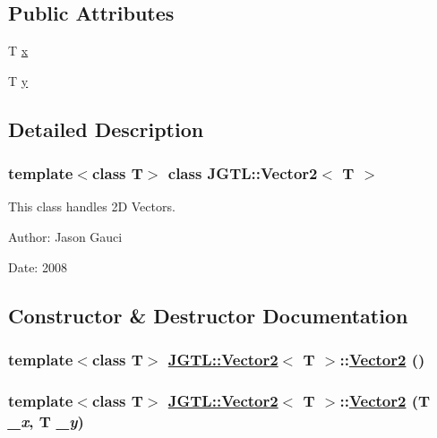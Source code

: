 \subsection*{Public Attributes}
\begin{CompactItemize}
\item 
T \hyperlink{class_j_g_t_l_1_1_vector2_74fc6db01fb0803a14a786f0a798746e}{x}
\item 
T \hyperlink{class_j_g_t_l_1_1_vector2_f01a24f7cf968ea1c9f0721b7bb00cb4}{y}
\end{CompactItemize}


\subsection{Detailed Description}
\subsubsection*{template$<$class T$>$ class JGTL::Vector2$<$ T $>$}

This class handles 2D Vectors. 

\begin{Desc}
\item[Author:]Jason Gauci \end{Desc}
\begin{Desc}
\item[Date:]2008 \end{Desc}




\subsection{Constructor \& Destructor Documentation}
\hypertarget{class_j_g_t_l_1_1_vector2_9dfa1d4fc791920450349e2c677c371a}{
\subsubsection[Vector2]{\setlength{\rightskip}{0pt plus 5cm}template$<$class T$>$ \hyperlink{class_j_g_t_l_1_1_vector2}{JGTL::Vector2}$<$ T $>$::\hyperlink{class_j_g_t_l_1_1_vector2}{Vector2} ()}}
\label{class_j_g_t_l_1_1_vector2_9dfa1d4fc791920450349e2c677c371a}


\hypertarget{class_j_g_t_l_1_1_vector2_c4221fdd7e9e3aa006c89c3acef84024}{
\subsubsection[Vector2]{\setlength{\rightskip}{0pt plus 5cm}template$<$class T$>$ \hyperlink{class_j_g_t_l_1_1_vector2}{JGTL::Vector2}$<$ T $>$::\hyperlink{class_j_g_t_l_1_1_vector2}{Vector2} (T {\em \_\-x}, T {\em \_\-y})}}
\label{class_j_g_t_l_1_1_vector2_c4221fdd7e9e3aa006c89c3acef84024}


